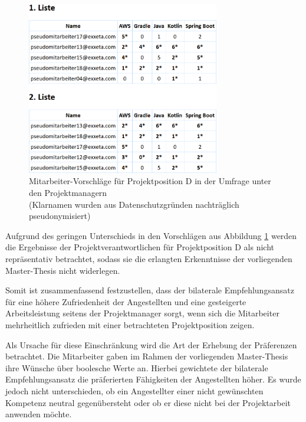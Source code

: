 \begin{figure}[h]
	\centering
	\includegraphics[width=0.75\textwidth]{gfx/projektposition-d.png}
	\caption[Mitarbeiter-Vorschläge für Projektposition D in der Umfrage unter den Projektmanagern]{Mitarbeiter-Vorschläge für Projektposition D in der Umfrage unter den Projektmanagern\\
	(Klarnamen wurden aus Datenschutzgründen nachträglich pseudonymisiert)}
	\label{fig:diskussion:interpretation:abb2}
\end{figure}

Aufgrund des geringen Unterschieds in den Vorschlägen aus Abbildung \ref{fig:diskussion:interpretation:abb2} werden die Ergebnisse der Projektverantwortlichen für Projektposition D als nicht repräsentativ betrachtet, sodass sie die erlangten Erkenntnisse der vorliegenden Master-Thesis nicht widerlegen.

Somit ist zusammenfassend festzustellen, dass der bilaterale Empfehlungsansatz für eine höhere Zufriedenheit der Angestellten und eine gesteigerte Arbeitsleistung seitens der Projektmanager sorgt, wenn sich die Mitarbeiter mehrheitlich zufrieden mit einer betrachteten Projektposition zeigen.

Als Ursache für diese Einschränkung wird die Art der Erhebung der Präferenzen betrachtet. Die Mitarbeiter gaben im Rahmen der vorliegenden Master-Thesis ihre Wünsche über boolesche Werte an. Hierbei gewichtete der bilaterale Empfehlungsansatz die präferierten Fähigkeiten der Angestellten höher. Es wurde jedoch nicht unterschieden, ob ein Angestellter einer nicht gewünschten Kompetenz neutral gegenübersteht oder ob er diese nicht bei der Projektarbeit anwenden möchte.

